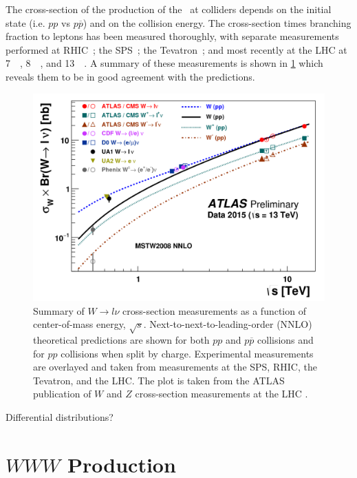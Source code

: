 The cross-section of the production of the \dubya~at colliders
depends on the initial state (i.e. $pp$ vs $p\overline{p}$) and on the
collision energy. 
The cross-section times branching fraction to leptons 
has been measured thoroughly, with separate measurements performed
at RHIC~\cite{PhysRevLett.106.062001};
the SPS~\cite{Albajar1987271,Alitti1992365};
the Tevatron~\cite{0954-3899-34-12-001,D0-4403-CONF};
and most recently at the LHC 
at 7~\TeV~\cite{PhysRevD.85.072004,Chatrchyan:1370079}, 
8~\TeV~\cite{PhysRevLett.112.191802}, 
and 13~\TeV~\cite{ATLAS-CONF-2015-039,CMS-PAS-SMP-15-004}. 
A summary of these measurements is shown in 
\fig\ref{fig:theory_wxsec} which reveals them to be in good agreement with 
the predictions.

\begin{figure}[ht]
\centering
\includegraphics[width=.8\textwidth]{figures/theory/wxsec.png}
\caption{Summary of $W\rightarrow l\nu$ cross-section measurements as 
a function of center-of-mass energy, $\sqrt{s}$. 
Next-to-next-to-leading-order (NNLO) theoretical
predictions are shown for both $pp$ and 
$p\overline{p}$ collisions and for $pp$ collisions when split by charge.
Experimental measurements are overlayed and taken from measurements
at the SPS, RHIC, the Tevatron, and the LHC.  The plot is taken
from the ATLAS publication of $W$ and $Z$ cross-section measurements
at the LHC \cite{ATLAS-CONF-2015-039}.  }
\label{fig:theory_wxsec}
\end{figure}

Differential distributions?





\section{$WWW$ Production}

